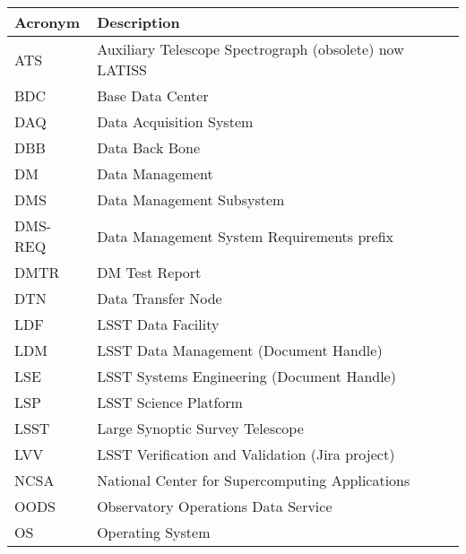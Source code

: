 \addtocounter{table}{-1}
\begin{longtable}{p{}p{}}\hline
\textbf{Acronym} & \textbf{Description}  \\\hline

ATS & Auxiliary Telescope Spectrograph (obsolete) now LATISS \\\hline
BDC &  Base Data Center \\\hline
DAQ & Data Acquisition System \\\hline
DBB & Data Back Bone \\\hline
DM & Data Management \\\hline
DMS & Data Management Subsystem \\\hline
DMS-REQ & Data Management System Requirements prefix \\\hline
DMTR & DM Test Report \\\hline
DTN & Data Transfer Node \\\hline
LDF & LSST Data Facility \\\hline
LDM & LSST Data Management (Document Handle) \\\hline
LSE & LSST Systems Engineering (Document Handle) \\\hline
LSP & LSST Science Platform \\\hline
LSST & Large Synoptic Survey Telescope \\\hline
LVV & LSST Verification and Validation (Jira project) \\\hline
NCSA & National Center for Supercomputing Applications \\\hline
OODS & Observatory Operations Data Service \\\hline
OS & Operating System \\\hline
\end{longtable}

